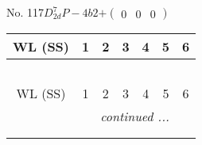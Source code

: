 \documentclass[fleqn,9pt,landscape]{jsarticle}
\begin{document}
\newpage
No. 117\quad$D_{2d}^{7}$\quad$P-4b2$\quad[ tetragonal ]\quad$+\begin{pmatrix} 0 & 0 & 0 \end{pmatrix}$
\begin{center}
\renewcommand{\arraystretch}{1.2}
\begin{longtable}{ccccccc}
 \hline \hline
WL (SS) & 1 & 2 & 3 & 4 & 5 & 6 \\ \hline \endfirsthead

\multicolumn{6}{l}{\tablename\ \thetable{}} \\
 \hline \hline
WL (SS) & 1 & 2 & 3 & 4 & 5 & 6 \\ \hline \endhead

 \hline \hline
\multicolumn{6}{r}{\footnotesize\it continued ...} \\ \endfoot

 \hline \hline
\multicolumn{6}{r}{} \\ \endlastfoot


\end{longtable}
\end{center}
\end{document}
